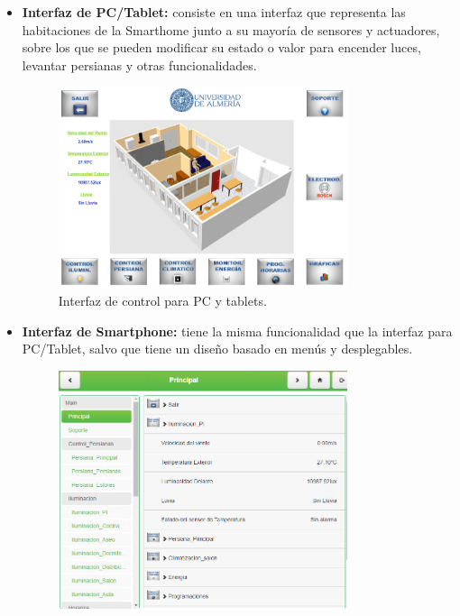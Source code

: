 \begin{itemize}
    \item \textbf{Interfaz de PC/Tablet:} consiste en una interfaz que representa las habitaciones de la Smarthome junto a su mayoría de sensores y actuadores, sobre los que se pueden modificar su estado o valor para encender luces, levantar persianas y otras funcionalidades.
    \begin{figure}[h]
        \centering
        \includegraphics[width=0.8\textwidth, keepaspectratio]{imagenes/capitulo3/interfazPC.png}
        \caption{Interfaz de control para PC y tablets.}
        \label{fig:interfazPC}
    \end{figure}
    \item \textbf{Interfaz de Smartphone:} tiene la misma funcionalidad que la interfaz para PC/Tablet, salvo que tiene un diseño basado en menús y desplegables.
    \begin{figure}[h]
        \centering
        \includegraphics[width=0.8\textwidth, keepaspectratio]{imagenes/capitulo3/interfazMovil.png}

\end{figure}
\end{itemize}
